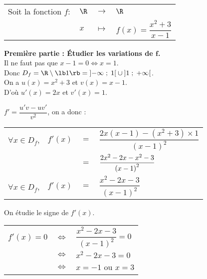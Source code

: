 \begin{tabular}{llll}
Soit la fonction $f :$ & $\R$ & $\longrightarrow$ & $\R$ \\
& $x$ & $\longmapsto$ & $f(x) = \dfrac{x^2 + 3}{x - 1}$ \\
\end{tabular}

\vspace*{.3cm}

\textbf{Première partie : Étudier les variations de $\mathbf{f}$.} \\

Il ne faut pas que $x-1 = 0 \Longleftrightarrow x = 1$. \\

Donc $D_f = \R \setminus \lb 1 \rb = \left]-\infty\; ; \; 1\right[\cup\left]1\; ; \; +\infty\right[$. \\

On a $u(x) = x^2 + 3$ et $v(x) = x - 1$. \\
D'où $u'(x) = 2x$ et $v'(x) = 1$. \\

\vspace*{.3cm}

$f' = \dfrac{u'v - uv'}{v^2}$, on a donc :

\begin{tabular}{llll}
$\forall x \in D_f$, & $f'(x)$ & $=$ & $\dfrac{2x\left(x-1\right)-\left(x^2 + 3\right)\times 1}{\left(x-1\right)^2}$ \vspace*{.3cm} \\
& & $=$ & $\dfrac{2x^2 - 2x - x^2 - 3}{\left(x-1\right)^2} \vspace*{.3cm}$ \\
$\forall x \in D_f$, & $f'(x)$ & $=$ & $\dfrac{x^2 - 2x - 3}{\left(x-1\right)^2}$ \vspace*{.3cm} \\
\end{tabular}

On étudie le signe de $f'(x)$. \\

\begin{tabular}{lll}
$f'(x) = 0$ & $\Longleftrightarrow$ & $\dfrac{x^2 - 2x - 3}{\left(x-1\right)^2} = 0$ \vspace*{.3cm} \\
& $\Longleftrightarrow$ & $x^2 - 2x - 3 = 0$ \vspace*{.3cm} \\
& $\Longleftrightarrow$ & $x= -1$ ou $x = 3$ \vspace*{.3cm}\\
\end{tabular}

